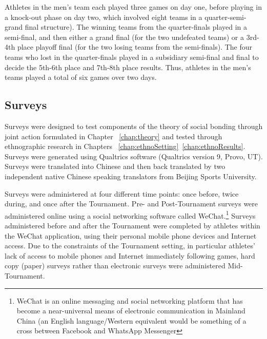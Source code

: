 \begin{CJK}{UTF8}{gbsn}
Athletes in the men's team each played three games on day one, before playing in a knock-out phase on day two, which involved eight teams in a quarter-semi-grand final structure). The winning teams from the quarter-finals played in a semi-final, and then either a grand final (for the two undefeated teams) or a 3rd-4th place playoff final (for the two losing teams from the semi-finals). The four teams who lost in the quarter-finals played in a subsidiary semi-final and final to decide the 5th-6th place and 7th-8th place results. Thus, athletes in the men's teams played a total of six games over two days.




\subsection{Surveys}
Surveys were designed to test components of the theory of social bonding through joint action formulated in Chapter ~\ref{chap:theory} and tested through ethnographic research in Chapters ~\ref{chap:ethnoSetting}\nobreakdash~\ref{chap:ethnoResults}.  Surveys were generated using Qualtrics software (Qualtrics version 9, Provo, UT). Surveys were translated into Chinese and then back translated by two independent native Chinese speaking translators from Beijing Sports University.

Surveys were administered at four different time points: once before, twice during, and once after the Tournament.  Pre- and Post-Tournament surveys were administered online using a social networking software called WeChat.\footnote{WeChat is an online messaging and social networking platform that has become a near-universal means of electronic communication in Mainland China (an English language/Western equivalent would be something of a cross between Facebook and WhatsApp Messenger} Surveys administered before and after the Tournament were completed by athletes within the WeChat application, using their personal mobile phone devices and Internet access.  Due to the constraints of the Tournament setting, in particular athletes’ lack of access to mobile phones and Internet immediately following games, hard copy (paper) surveys rather than electronic surveys were administered Mid-Tournament.




\end{CJK}
